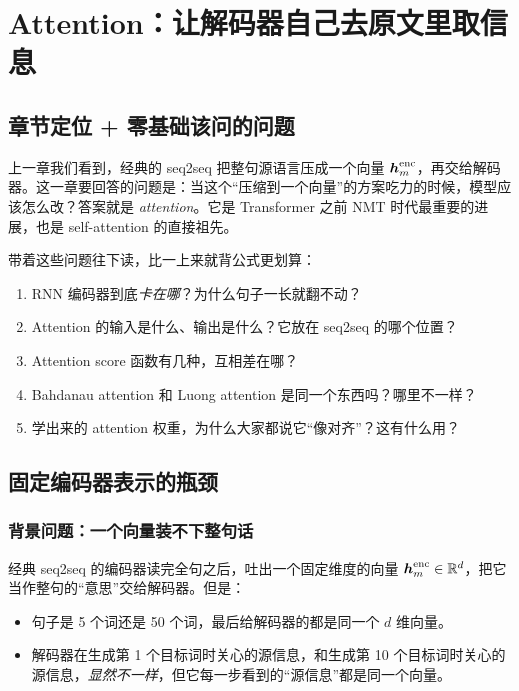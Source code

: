 \section{Attention：让解码器自己去原文里取信息}
\label{ch:attention}

\subsection{章节定位 + 零基础该问的问题}

上一章我们看到，经典的 seq2seq 把整句源语言压成一个向量 $\boldsymbol{h}^{\mathrm{enc}}_m$，再交给解码器。这一章要回答的问题是：当这个“压缩到一个向量”的方案吃力的时候，模型应该怎么改？答案就是 \emph{attention}。它是 Transformer 之前 NMT 时代最重要的进展，也是 self-attention 的直接祖先。

\begin{problemblock}[一上来该问的几个问题]
带着这些问题往下读，比一上来就背公式更划算：
\begin{enumerate}
  \item RNN 编码器到底\emph{卡在哪}？为什么句子一长就翻不动？
  \item Attention 的输入是什么、输出是什么？它放在 seq2seq 的哪个位置？
  \item Attention score 函数有几种，互相差在哪？
  \item Bahdanau attention 和 Luong attention 是同一个东西吗？哪里不一样？
  \item 学出来的 attention 权重，为什么大家都说它“像对齐”？这有什么用？
\end{enumerate}
\end{problemblock}

\subsection{固定编码器表示的瓶颈}
\label{sec:bottleneck}

\subsubsection{背景问题：一个向量装不下整句话}

\begin{problemblock}
经典 seq2seq 的编码器读完全句之后，吐出一个固定维度的向量 $\boldsymbol{h}^{\mathrm{enc}}_m \in \mathbb{R}^{d}$，把它当作整句的“意思”交给解码器。但是：
\begin{itemize}
  \item 句子是 5 个词还是 50 个词，最后给解码器的都是同一个 $d$ 维向量。
  \item 解码器在生成第 1 个目标词时关心的源信息，和生成第 10 个目标词时关心的源信息，\emph{显然不一样}，但它每一步看到的“源信息”都是同一个向量。
\end{itemize}
\end{problemblock}

